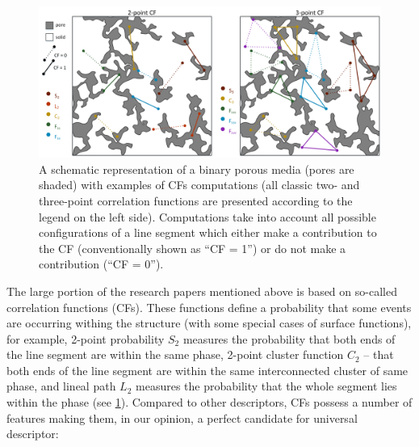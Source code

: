 \documentclass[reprint,amsmath,amssymb,aps,pre,showkeys,showpacs]{revtex4-1}
\begin{document}
\begin{figure}[ht]
  \centering
  \includegraphics[width=0.8\linewidth]{images/3point.png}
  \caption[]{A schematic representation of a binary porous media (pores are
    shaded) with examples of CFs computations (all classic two- and three-point
    correlation functions are presented according to the legend on the left
    side). Computations take into account all possible configurations of a line
    segment which either make a contribution to the CF (conventionally shown as
    ``CF = 1'') or do not make a contribution (``CF = 0'').}
  \label{fig:3point-scheme}
\end{figure}
The large portion of the research papers mentioned above
\cite{rozenbaum2014,karsanina2015,ledesma2018,derossi2019,portillo2018developing,
  takada2003three,hopkins2013stars,jiao2013,Torquato_book,roding2020predicting,
  KarsaninaEJSS,capek2009,gerke2019tensor,REVpaper,LavrukhinPRE,Adler_recon,Y-T,
  tahmasebiPRL,Euras2012,EPL2,karsaninaPRL,jiao2007,SciRep1,Havelka,Geoderma2018}
is based on so-called correlation functions (CFs). These functions define a
probability that some events are occurring withing the structure (with some
special cases of surface functions), for example, 2-point probability $S_2$
measures the probability that both ends of the line segment are within the same
phase, 2-point cluster function $C_2$ -- that both ends of the line segment are
within the same interconnected cluster of same phase, and lineal path $L_2$
measures the probability that the whole segment lies within the phase (see
\cref{fig:3point-scheme}). Compared to other descriptors, CFs possess a number
of features making them, in our opinion, a perfect candidate for universal
descriptor:
\end{document}
